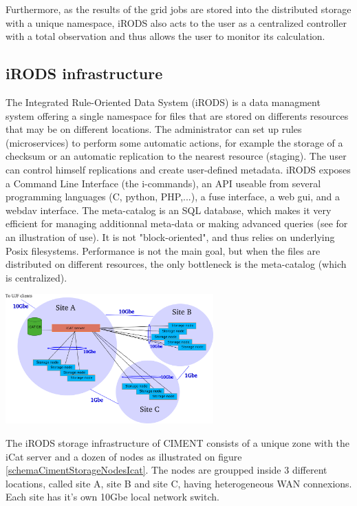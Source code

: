 \documentclass[a4paper, 10pt]{article}
\begin{document}
\begin{multicols}{2}
Furthermore, as the results of the grid jobs are stored into the distributed storage with a unique namespace, iRODS also acts to the user as a centralized controller with a 
total observation and thus allows the user to monitor its calculation.
~\\

\subsection{iRODS infrastructure}


The Integrated Rule-Oriented Data System (iRODS) is a data managment system offering a single namespace for files that are stored on differents resources that may be on different locations. The administrator can set up rules (microservices) to perform some automatic actions, for example the storage of a checksum or an automatic replication to the nearest resource (staging).  The user can control himself replications and create user-defined metadata. iRODS exposes a Command Line Interface (the i-commands), an API useable from several programming languages (C, python, PHP,...), a fuse interface, a web gui, and a webdav interface. The meta-catalog is an SQL database, which makes it very efficient for managing additionnal meta-data or making advanced queries (see \cite{key:CCQSC2005} for an illustration of use). It is not "block-oriented", and thus relies on underlying Posix filesystems. Performance is not the main goal, but when the files are distributed on different resources, the only bottleneck is the meta-catalog (which is centralized).
\\

\begin{center}%
\centering
{}
\includegraphics[width=8cm]{schemaCimentStorageNodesIcat.png}
\end{center}


The iRODS storage infrastructure of CIMENT consists of a unique zone with the iCat server and a dozen of nodes as illustrated on figure \ref{schemaCimentStorageNodesIcat}. The nodes are groupped inside 3 different locations, called site A, site B and site C, having heterogeneous WAN connexions. Each site has it's own 10Gbe local network switch.


\end{multicols}
\end{document}
